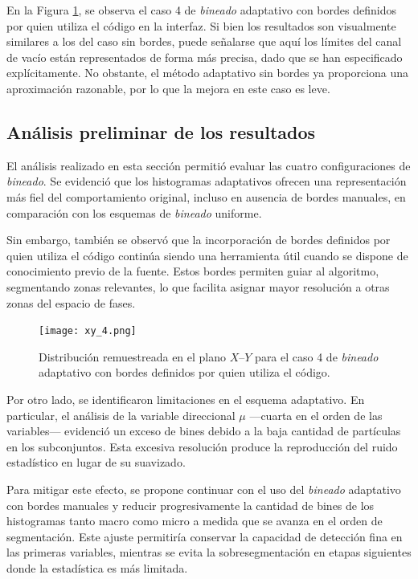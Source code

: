 En la Figura \ref{fig:xy_4}, se observa el caso 4 de \textit{bineado} adaptativo con bordes definidos por quien utiliza el código en la interfaz. Si bien los resultados son visualmente similares a los del caso sin bordes, puede señalarse que aquí los límites del canal de vacío están representados de forma más precisa, dado que se han especificado explícitamente. No obstante, el método adaptativo sin bordes ya proporciona una aproximación razonable, por lo que la mejora en este caso es leve.

\subsection{Análisis preliminar de los resultados}

El análisis realizado en esta sección permitió evaluar las cuatro configuraciones de \textit{bineado}. Se evidenció que los histogramas adaptativos ofrecen una representación más fiel del comportamiento original, incluso en ausencia de bordes manuales, en comparación con los esquemas de \textit{bineado} uniforme.

Sin embargo, también se observó que la incorporación de bordes definidos por quien utiliza el código continúa siendo una herramienta útil cuando se dispone de conocimiento previo de la fuente. Estos bordes permiten guiar al algoritmo, segmentando zonas relevantes, lo que facilita asignar mayor resolución a otras zonas del espacio de fases.

\begin{figure}[H]
    \centering
    \texttt{[image: xy\_4.png]}
    \caption{Distribución remuestreada en el plano $X$–$Y$ para el caso 4 de \textit{bineado} adaptativo con bordes definidos por quien utiliza el código.}
    \label{fig:xy_4}
\end{figure}

Por otro lado, se identificaron limitaciones en el esquema adaptativo. En particular, el análisis de la variable direccional $\mu$ —cuarta en el orden de las variables— evidenció un exceso de bines debido a la baja cantidad de partículas en los subconjuntos. Esta excesiva resolución produce la reproducción del ruido estadístico en lugar de su suavizado.

Para mitigar este efecto, se propone continuar con el uso del \textit{bineado} adaptativo con bordes manuales y reducir progresivamente la cantidad de bines de los histogramas tanto macro como micro a medida que se avanza en el orden de segmentación. Este ajuste permitiría conservar la capacidad de detección fina en las primeras variables, mientras se evita la sobresegmentación en etapas siguientes donde la estadística es más limitada.

